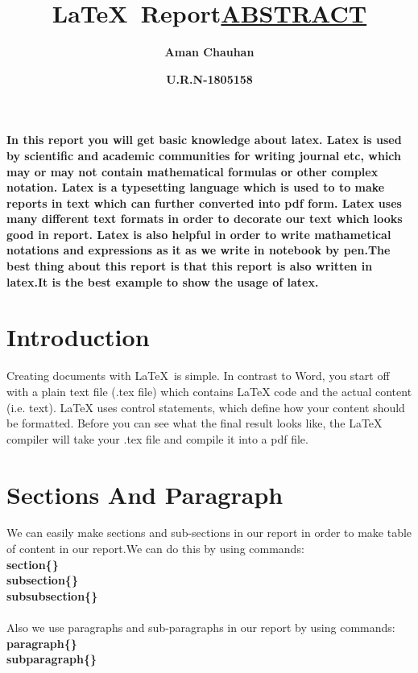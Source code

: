 \documentclass{article}
\title{\textbf{\LaTeX\ Report}}
\date{\textbf{U.R.N-1805158}}
\author{\textbf{Aman Chauhan}}
\begin{document}
\maketitle
\newpage
\title{\underline{ABSTRACT}}
\paragraph{In this report you will get basic knowledge about latex. Latex is used by scientific and academic communities for writing journal etc, which may or may not contain mathematical formulas or other complex notation. Latex is a typesetting language which is used to to make reports in text which can further converted into pdf form. Latex uses many different text formats in order to decorate our text which looks good in report. Latex is also helpful in order to write mathametical notations and expressions as it as we write in notebook by pen.The best thing about this report is that this report is also written in latex.It is the best example to show the usage of latex. }
\newpage

\section{Introduction}
Creating documents with \LaTeX\ is simple. In contrast to Word, you start off with a plain       text file (.tex file) which contains LaTeX code and the actual content (i.e. text). LaTeX 	uses control statements, which define how your content should be formatted. Before you 			can see what the final result looks like, the LaTeX compiler will take your .tex file and 	compile it into a pdf file.
	
\section{Sections And Paragraph}
We can easily make sections and sub-sections in our report in order to make table of 			content in our report.We can do this by using commands:\\
\textbf{section\{\}}\\
\textbf{subsection\{\}}\\
\textbf{subsubsection\{\}}\\\\
Also we use paragraphs and sub-paragraphs in our report by using commands:\\
\textbf{paragraph\{\}}\\
\textbf{subparagraph\{\}}
	
\end{document}
